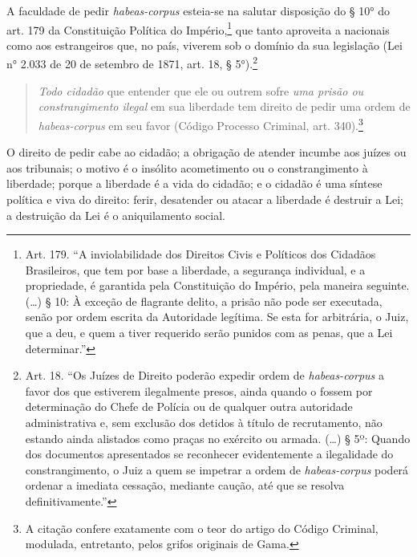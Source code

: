 A faculdade de pedir \emph{habeas-corpus} esteia-se na salutar
disposição do § 10° do art. 179 da Constituição Política do
Império,\footnote{Art. 179. ``A inviolabilidade dos Direitos Civis e
  Políticos dos Cidadãos Brasileiros, que tem por base a liberdade, a
  segurança individual, e a propriedade, é garantida pela Constituição
  do Império, pela maneira seguinte. (\ldots{}) § 10: À exceção de flagrante
  delito, a prisão não pode ser executada, senão por ordem escrita da
  Autoridade legítima. Se esta for arbitrária, o Juiz, que a deu, e quem
  a tiver requerido serão punidos com as penas, que a Lei determinar.''}
que tanto aproveita a nacionais como aos estrangeiros que, no país,
viverem sob o domínio da sua legislação
(Lei n° 2.033 de 20 de setembro
de 1871, art. 18, § 5°).\footnote{Art. 18. ``Os Juízes de Direito \label{art18}
  poderão expedir ordem de \emph{habeas-corpus} a favor dos que
  estiverem ilegalmente presos, ainda quando o fossem por determinação
  do Chefe de Polícia ou de qualquer outra autoridade administrativa e,
  sem exclusão dos detidos à título de recrutamento, não estando ainda
  alistados como praças no exército ou armada. (\ldots{}) § 5º: Quando dos
  documentos apresentados se reconhecer evidentemente a ilegalidade do
  constrangimento, o Juiz a quem se impetrar a ordem de
  \emph{habeas-corpus} poderá ordenar a imediata cessação, mediante
  caução, até que se resolva definitivamente.''}

\begin{quote}
\emph{Todo cidadão} que entender que ele ou outrem sofre \emph{uma
prisão ou constrangimento ilegal} em sua liberdade tem direito de pedir
uma ordem de \emph{habeas-corpus} em seu favor (Código Processo
Criminal, art. 340).\footnote{A citação confere exatamente com o
  teor do artigo do Código Criminal, modulada, entretanto, pelos grifos
  originais de Gama.}
 \end{quote} 

O direito de pedir cabe ao cidadão; a obrigação de atender incumbe aos
juízes ou aos tribunais; o motivo é o insólito acometimento ou o
constrangimento à liberdade; porque a liberdade é a vida do cidadão; e o
cidadão é uma síntese política e viva do direito: ferir, desatender ou
atacar a liberdade é destruir a Lei; a destruição da Lei é o
aniquilamento social.

